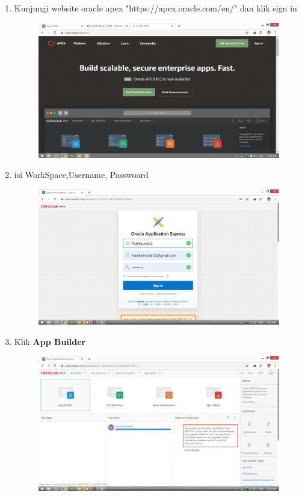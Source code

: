 \documentclass[11pt]{article}
\begin{document}
\begin{enumerate}
\newpage
\item 
Kunjungi website oracle apex "https://apex.oracle.com/en/" dan klik sign in
	\begin{figure}[h]
		\includegraphics[scale= 0.1]{img/web.png}
		\centering
		\caption{}
	\label{langkah6}
	\end{figure}

\item isi WorkSpace,Username, Passwoard
	\begin{figure}[h]
        \centerline{\includegraphics[scale=0.1]{img/1.png}}
        \caption{}
        \centering
	\label{langkah7}
	\end{figure}

\newpage
\item Klik \textbf{App Builder}
	\begin{figure}[h]
        \centerline{\includegraphics[scale=0.1]{img/2.png}}
        \centering
        \caption{}
		\label{langkah8}
		\end{figure}



\end{enumerate}
\end{document}
